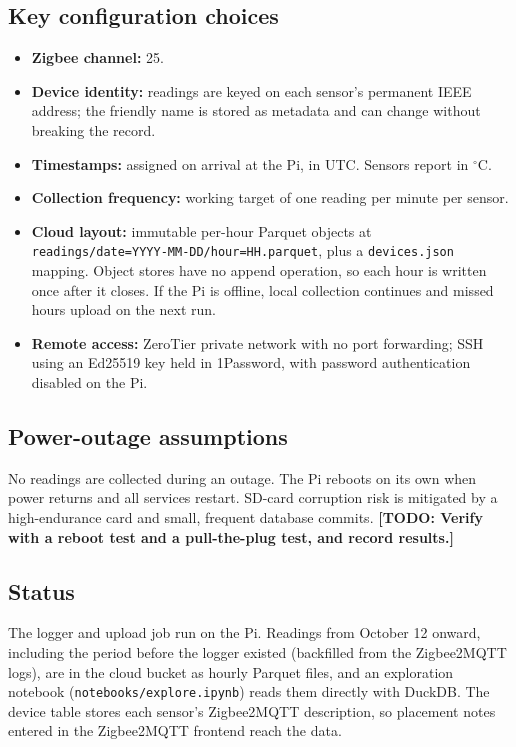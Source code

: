 \documentclass[11pt,letterpaper]{article}
\newcommand{\todo}[1]{\textbf{[TODO: #1]}}
\begin{document}
\subsection{Key configuration choices}

\begin{itemize}
  \item \textbf{Zigbee channel:} 25.
  \item \textbf{Device identity:} readings are keyed on each sensor's permanent
    IEEE address; the friendly name is stored as metadata and can change without
    breaking the record.
  \item \textbf{Timestamps:} assigned on arrival at the Pi, in UTC. Sensors
    report in $^\circ$C.
  \item \textbf{Collection frequency:} working target of one reading per
    minute per sensor.
  \item \textbf{Cloud layout:} immutable per-hour Parquet objects at
    \texttt{readings/date=\allowbreak YYYY-MM-DD/\allowbreak hour=HH.parquet}, plus a
    \texttt{devices.json} mapping. Object stores have no append operation, so
    each hour is written once after it closes. If the Pi is offline, local
    collection continues and missed hours upload on the next run.
  \item \textbf{Remote access:} ZeroTier private network with no port
    forwarding; SSH using an Ed25519 key held in 1Password, with password
    authentication disabled on the Pi.
\end{itemize}

\subsection{Power-outage assumptions}

No readings are collected during an outage. The Pi reboots on its own when power
returns and all services restart. SD-card corruption risk is mitigated by a
high-endurance card and small, frequent database commits. \todo{Verify with a
reboot test and a pull-the-plug test, and record results.}

\subsection{Status}

The logger and upload job run on the Pi. Readings from October 12 onward,
including the period before the logger existed (backfilled from the
Zigbee2MQTT logs), are in the cloud bucket as hourly Parquet files, and an
exploration notebook (\texttt{notebooks/explore.ipynb}) reads them directly with
DuckDB. The device table stores each sensor's Zigbee2MQTT description, so
placement notes entered in the Zigbee2MQTT frontend reach the data.
\end{document}
